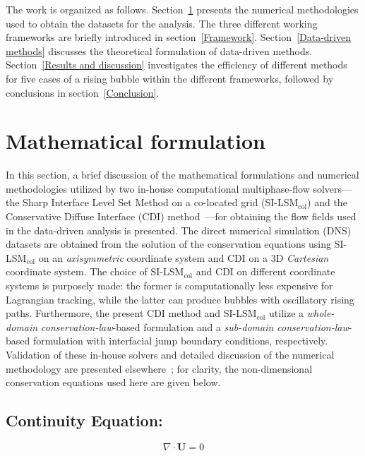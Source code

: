 \documentclass[a4paper,fleqn]{cas-sc}
\begin{document}
	The work is organized as follows. Section~\ref{Mathematical formulation} presents the numerical methodologies used to obtain the datasets for the analysis. The three different working frameworks are briefly introduced in section~\ref{Framework}. Section~\ref {Data-driven methods} discusses the theoretical formulation of data-driven methods. Section~\ref{Results and discussion} investigates the efficiency of different methods for five cases of a rising bubble within the different frameworks, followed by conclusions in section~\ref{Conclusion}.
	\section{Mathematical formulation}
	\label{Mathematical formulation}
	
	In this section, a brief discussion of the mathematical formulations and numerical methodologies utilized by two in-house computational multiphase-flow solvers---the Sharp Interface Level Set Method on a co-located grid (SI-LSM$_{\text{col}}$) \cite{Chirammel2023} and the Conservative Diffuse Interface (CDI) method~\cite{Jain2020}---for obtaining the flow fields used in the data-driven analysis is presented. The direct numerical simulation (DNS) datasets are obtained from the solution of the conservation equations using SI-LSM$_{\text{col}}$ on an \textit{axisymmetric} coordinate system and CDI on a 3D \textit{Cartesian} coordinate system. The choice of SI-LSM$_{\text{col}}$ and CDI on different coordinate systems is purposely made: the former is computationally less expensive for Lagrangian tracking, while the latter can produce bubbles with oscillatory rising paths. Furthermore, the present CDI method and SI-LSM$_{\text{col}}$ utilize a \textit{whole-domain conservation-law}-based formulation and a \textit{sub-domain conservation-law}-based formulation with interfacial jump boundary conditions, respectively. Validation of these in-house solvers and detailed discussion of the numerical methodology are presented elsewhere~\cite{Chirammel2023, Salimi2025}; for clarity, the non-dimensional conservation equations used here are given below.
	
	\subsection*{Continuity Equation:}
	\begin{equation}\label{eqt:continuity}
		\nabla\cdot\mathbf{U}=0
	\end{equation}
	
\end{document}
